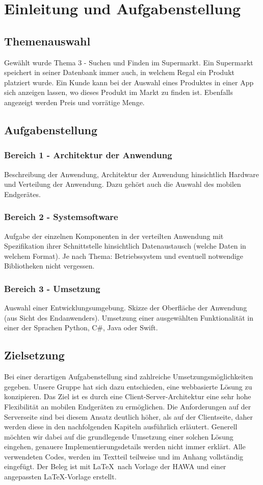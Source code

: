 \section{Einleitung und Aufgabenstellung}

\subsection{Themenauswahl}
Gewählt wurde Thema 3 - Suchen und Finden im Supermarkt.
Ein Supermarkt speichert in seiner Datenbank immer auch, in welchem Regal ein Produkt platziert wurde.
Ein Kunde kann bei der Auswahl eines Produktes in einer App sich anzeigen lassen, wo dieses Produkt im Markt zu finden ist.
Ebenfalls angezeigt werden Preis und vorrätige Menge.

\subsection{Aufgabenstellung}
\subsubsection{Bereich 1 - Architektur der Anwendung}
Beschreibung der Anwendung, Architektur der Anwendung hinsichtlich Hardware und Verteilung der Anwendung.
Dazu gehört auch die Auswahl des mobilen Endgerätes.

\subsubsection{Bereich 2 - Systemsoftware}
Aufgabe der einzelnen Komponenten in der verteilten Anwendung mit Spezifikation ihrer Schnittstelle hinsichtlich Datenaustausch (welche Daten in welchem Format).
Je nach Thema: Betriebssystem und eventuell notwendige Bibliotheken nicht vergessen.

\subsubsection{Bereich 3 - Umsetzung}
Auswahl einer Entwicklungsumgebung.
Skizze der Oberfläche der Anwendung (aus Sicht des Endanwenders).
Umsetzung einer ausgewählten Funktionalität in einer der Sprachen Python, C\#, Java oder Swift.

\subsection{Zielsetzung}
Bei einer derartigen Aufgabenstellung sind zahlreiche Umsetzungsmöglichkeiten gegeben. 
Unsere Gruppe hat sich dazu entschieden, eine webbasierte Lösung zu konzipieren.
Das Ziel ist es durch eine Client-Server-Architektur eine sehr hohe Flexibilität an mobilen Endgeräten zu ermöglichen.
Die Anforderungen auf der Serverseite sind bei diesem Ansatz deutlich höher, als auf der Clientseite, daher werden diese in den nachfolgenden Kapiteln ausführlich erläutert.
Generell möchten wir dabei auf die grundlegende Umsetzung einer solchen Lösung eingehen, genauere Implementierungsdetails werden nicht immer erklärt.
Alle verwendeten Codes, werden im Textteil teilweise und im Anhang vollständig eingefügt.
Der Beleg ist mit \LaTeX~nach Vorlage der HAWA und einer angepassten \LaTeX-Vorlage erstellt.